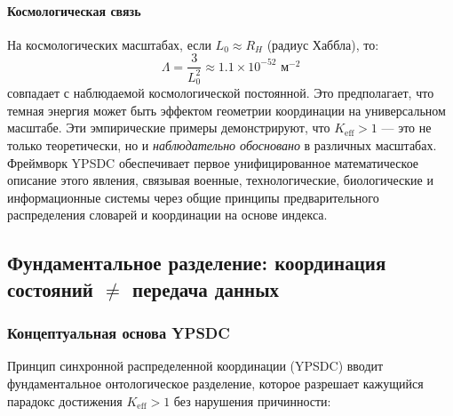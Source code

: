 \documentclass[11pt,a4paper]{article}
\begin{document}
	\paragraph{Космологическая связь}
	На космологических масштабах, если $L_0 \approx R_H$ (радиус Хаббла), то:
	\begin{equation}
		\Lambda = \frac{3}{L_0^2} \approx 1.1 \times 10^{-52} \text{ м}^{-2}
	\end{equation}
	совпадает с наблюдаемой космологической постоянной. Это предполагает, что темная энергия 
	может быть эффектом геометрии координации на универсальном масштабе.
	Эти эмпирические примеры демонстрируют, что $K_{\mathrm{eff}} > 1$ — это не только теоретически, но и \emph{наблюдательно обосновано} в различных масштабах. Фреймворк YPSDC обеспечивает первое унифицированное математическое описание этого явления, связывая военные, технологические, биологические и информационные системы через общие принципы предварительного распределения словарей и координации на основе индекса.
	
	\subsection{Фундаментальное разделение: координация состояний $\neq$ передача данных}
	\label{subsec:coordination-vs-data}
	
	\subsubsection{Концептуальная основа YPSDC}
	
	Принцип синхронной распределенной координации (YPSDC) вводит фундаментальное онтологическое разделение, которое разрешает кажущийся парадокс достижения $K_{\mathrm{eff}} > 1$ без нарушения причинности:
	
\end{document}
